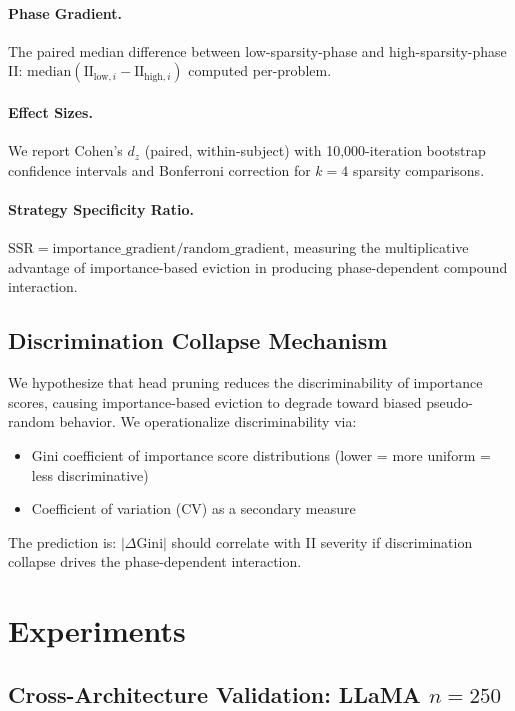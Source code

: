 \documentclass[11pt]{article}
\begin{document}
\paragraph{Phase Gradient.}
The paired median difference between low-sparsity-phase and high-sparsity-phase II: $\text{median}(\text{II}_{\text{low},i} - \text{II}_{\text{high},i})$ computed per-problem.

\paragraph{Effect Sizes.}
We report Cohen's $d_z$ (paired, within-subject) with 10,000-iteration bootstrap confidence intervals and Bonferroni correction for $k=4$ sparsity comparisons.

\paragraph{Strategy Specificity Ratio.}
$\text{SSR} = \text{importance\_gradient} / \text{random\_gradient}$, measuring the multiplicative advantage of importance-based eviction in producing phase-dependent compound interaction.

\subsection{Discrimination Collapse Mechanism}

We hypothesize that head pruning reduces the discriminability of importance scores, causing importance-based eviction to degrade toward biased pseudo-random behavior. We operationalize discriminability via:
\begin{itemize}
\item Gini coefficient of importance score distributions (lower = more uniform = less discriminative)
\item Coefficient of variation (CV) as a secondary measure
\end{itemize}

The prediction is: $|\Delta\text{Gini}|$ should correlate with II severity if discrimination collapse drives the phase-dependent interaction.

\section{Experiments}

\subsection{Cross-Architecture Validation: LLaMA $n=250$}
\label{sec:llama}
\end{document}
